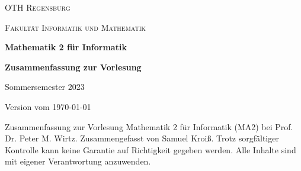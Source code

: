 \begin{titlepage}
    \centering
    {\textsc{OTH Regensburg} \par}
    {\textsc{Fakultät Informatik und Mathematik} \par}
    \vspace{8cm}
    {\huge\bfseries 
        Mathematik 2 für Informatik
    \par}
    \vspace{12pt}
    {\Large\bfseries 
        Zusammenfassung zur Vorlesung
    \par}
    \vspace{8cm}
    {\large Sommersemester 2023 \par Version vom \today\par}
    \vfill
    Zusammenfassung zur Vorlesung Mathematik 2 für Informatik (MA2) bei Prof. Dr. Peter M. Wirtz. Zusammengefasst von Samuel Kroiß. Trotz sorgfältiger Kontrolle kann keine Garantie auf Richtigkeit gegeben werden. Alle Inhalte sind mit eigener Verantwortung anzuwenden.
\end{titlepage}